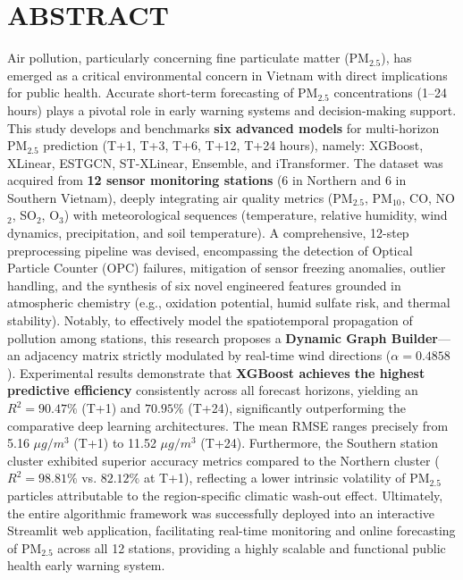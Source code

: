 \chapter*{ABSTRACT}

Air pollution, particularly concerning fine particulate matter (PM$_{2.5}$), has emerged as a critical environmental concern in Vietnam with direct implications for public health. Accurate short-term forecasting of PM$_{2.5}$ concentrations (1–24 hours) plays a pivotal role in early warning systems and decision-making support. This study develops and benchmarks \textbf{six advanced models} for multi-horizon PM$_{2.5}$ prediction (T+1, T+3, T+6, T+12, T+24 hours), namely: XGBoost, XLinear, ESTGCN, ST-XLinear, Ensemble, and iTransformer. The dataset was acquired from \textbf{12 sensor monitoring stations} (6 in Northern and 6 in Southern Vietnam), deeply integrating air quality metrics (PM$_{2.5}$, PM$_{10}$, CO, NO$_2$, SO$_2$, O$_3$) with meteorological sequences (temperature, relative humidity, wind dynamics, precipitation, and soil temperature). A comprehensive, 12-step preprocessing pipeline was devised, encompassing the detection of Optical Particle Counter (OPC) failures, mitigation of sensor freezing anomalies, outlier handling, and the synthesis of six novel engineered features grounded in atmospheric chemistry (e.g., oxidation potential, humid sulfate risk, and thermal stability). Notably, to effectively model the spatiotemporal propagation of pollution among stations, this research proposes a \textbf{Dynamic Graph Builder}—an adjacency matrix strictly modulated by real-time wind directions ($\alpha = 0.4858$). Experimental results demonstrate that \textbf{XGBoost achieves the highest predictive efficiency} consistently across all forecast horizons, yielding an $R^2 = 90.47\%$ (T+1) and $70.95\%$ (T+24), significantly outperforming the comparative deep learning architectures. The mean RMSE ranges precisely from 5.16 $\mu g/m^3$ (T+1) to 11.52 $\mu g/m^3$ (T+24). Furthermore, the Southern station cluster exhibited superior accuracy metrics compared to the Northern cluster ($R^2 = 98.81\%$ vs. $82.12\%$ at T+1), reflecting a lower intrinsic volatility of PM$_{2.5}$ particles attributable to the region-specific climatic wash-out effect. Ultimately, the entire algorithmic framework was successfully deployed into an interactive Streamlit web application, facilitating real-time monitoring and online forecasting of PM$_{2.5}$ across all 12 stations, providing a highly scalable and functional public health early warning system.